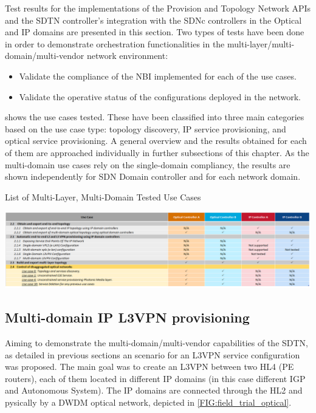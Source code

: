 \documentclass[a4paper,fleqn]{cas-dc}
\begin{document}
Test results for the implementations of the Provision and Topology Network APIs and the SDTN controller’s integration with the SDNc controllers in the Optical and IP domains are presented in this section. Two types of tests have been done in order to demonstrate orchestration functionalities in the multi-layer/multi-domain/multi-vendor network environment: 
\begin{itemize}
    \item Validate the compliance of the NBI implemented for each of the use cases.
    \item Validate the operative status of the configurations deployed in the network. 
\end{itemize}

 shows the use cases tested. These have been classified into three main categories based on the use case type: topology discovery, IP service provisioning, and optical service provisioning. A general overview and the results obtained for each of them are approached individually in further subsections of this chapter. As the multi-domain use cases rely on the single-domain compliancy, the results are shown independently for SDN Domain controller and for each network domain.

\begin{table}
	\caption{List of Multi-Layer, Multi-Domain Tested Use Cases}
	\centering
		\includegraphics[scale=0.5]{figs/tested_use_cases.png}
	\label{TAB:tested_use_cases}
\end{table}

\subsection{Multi-domain IP L3VPN provisioning}

Aiming to demonstrate the multi-domain/multi-vendor capabilities of the SDTN, as detailed in previous sections an scenario for an L3VPN service configuration was proposed. The main goal was to create an L3VPN between two HL4 (PE routers), each of them located in different IP domains (in this case different IGP and Autonomous System). The IP domains are connected through the HL2 and pysically by a DWDM optical network, depicted in \cref{FIG:field_trial_optical}. 
\end{document}
